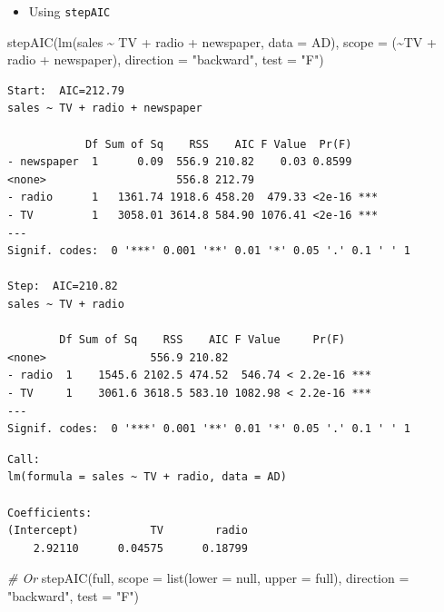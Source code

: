 \documentclass[
]{article}
\newenvironment{Shaded}{\begin{snugshade}}{\end{snugshade}}
\newcommand{\AttributeTok}[1]{\textcolor[rgb]{0.77,0.63,0.00}{#1}}
\newcommand{\CommentTok}[1]{\textcolor[rgb]{0.56,0.35,0.01}{\textit{#1}}}
\newcommand{\FunctionTok}[1]{\textcolor[rgb]{0.00,0.00,0.00}{#1}}
\newcommand{\NormalTok}[1]{#1}
\newcommand{\SpecialCharTok}[1]{\textcolor[rgb]{0.00,0.00,0.00}{#1}}
\newcommand{\StringTok}[1]{\textcolor[rgb]{0.31,0.60,0.02}{#1}}
\providecommand{\tightlist}{%
  \setlength{\itemsep}{0pt}\setlength{\parskip}{0pt}}
\begin{document}
\begin{itemize}
\tightlist
\item
  Using \texttt{stepAIC}
\end{itemize}

\begin{Shaded}
\begin{Highlighting}[]
\FunctionTok{stepAIC}\NormalTok{(}\FunctionTok{lm}\NormalTok{(sales }\SpecialCharTok{\textasciitilde{}}\NormalTok{ TV }\SpecialCharTok{+}\NormalTok{ radio }\SpecialCharTok{+}\NormalTok{ newspaper, }\AttributeTok{data =}\NormalTok{ AD), }\AttributeTok{scope =}\NormalTok{ (}\SpecialCharTok{\textasciitilde{}}\NormalTok{TV }\SpecialCharTok{+}\NormalTok{ radio }\SpecialCharTok{+}\NormalTok{ newspaper), }\AttributeTok{direction =} \StringTok{"backward"}\NormalTok{, }\AttributeTok{test =} \StringTok{"F"}\NormalTok{)}
\end{Highlighting}
\end{Shaded}

\begin{verbatim}
Start:  AIC=212.79
sales ~ TV + radio + newspaper

            Df Sum of Sq    RSS    AIC F Value  Pr(F)    
- newspaper  1      0.09  556.9 210.82    0.03 0.8599    
<none>                    556.8 212.79                   
- radio      1   1361.74 1918.6 458.20  479.33 <2e-16 ***
- TV         1   3058.01 3614.8 584.90 1076.41 <2e-16 ***
---
Signif. codes:  0 '***' 0.001 '**' 0.01 '*' 0.05 '.' 0.1 ' ' 1

Step:  AIC=210.82
sales ~ TV + radio

        Df Sum of Sq    RSS    AIC F Value     Pr(F)    
<none>                556.9 210.82                      
- radio  1    1545.6 2102.5 474.52  546.74 < 2.2e-16 ***
- TV     1    3061.6 3618.5 583.10 1082.98 < 2.2e-16 ***
---
Signif. codes:  0 '***' 0.001 '**' 0.01 '*' 0.05 '.' 0.1 ' ' 1
\end{verbatim}

\begin{verbatim}
Call:
lm(formula = sales ~ TV + radio, data = AD)

Coefficients:
(Intercept)           TV        radio  
    2.92110      0.04575      0.18799  
\end{verbatim}

\begin{Shaded}
\begin{Highlighting}[]
\CommentTok{\# Or}
\FunctionTok{stepAIC}\NormalTok{(full, }\AttributeTok{scope =} \FunctionTok{list}\NormalTok{(}\AttributeTok{lower =}\NormalTok{ null, }\AttributeTok{upper =}\NormalTok{ full), }\AttributeTok{direction =} \StringTok{"backward"}\NormalTok{, }\AttributeTok{test =} \StringTok{"F"}\NormalTok{)}
\end{Highlighting}
\end{Shaded}
\end{document}
